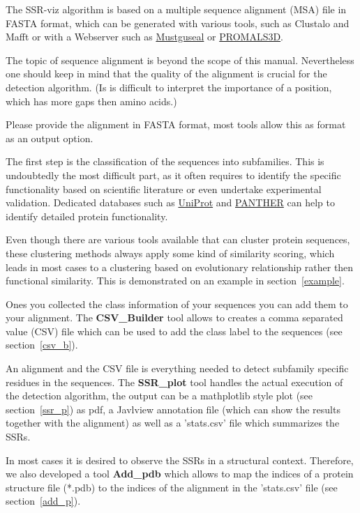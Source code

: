 \documentclass[a4paper,10pt]{article}
\begin{document}
The SSR-viz algorithm is based on a multiple sequence alignment (MSA) file in 
FASTA format, which can be generated with various tools, such as Clustalo 
and Mafft or with a Webserver such as 
\href{https://zeus.cmm.msu.ru/#scenario=2}{Mustguseal} or 
\href{http://prodata.swmed.edu/promals3d/promals3d.php}{PROMALS3D}.

The topic of sequence alignment is beyond the scope of this manual.  
Nevertheless one should keep in mind that 
the quality of the alignment is crucial for the detection algorithm.
(Is is difficult to interpret the importance of a position, which has
more gaps then amino acids.)

Please provide the alignment in FASTA format, most tools allow this as format as
an output option.

The first step is the classification of the sequences into subfamilies.
This is undoubtedly the most difficult part, as it often requires 
to identify the specific functionality based on scientific literature
or even undertake experimental validation. Dedicated databases such as 
\href{https://www.uniprot.org/}{UniProt} and \href{http://www.pantherdb.org/downloads/index.jsp}{PANTHER} 
can help to identify 
detailed protein functionality. 

Even though there are various tools available that can cluster protein sequences, 
these clustering methods always apply some kind of similarity scoring,
which leads in most cases to a clustering based on evolutionary relationship 
rather then functional similarity. 
This is demonstrated on an example in section~\ref{example}.

Ones you collected the class information of your sequences you can add
them to your alignment. The \textbf{CSV\_Builder} tool allows to creates 
a comma separated value (CSV) file which can be used to add the class label to the sequences
(see section~\ref{csv_b}).

An alignment and the CSV file is everything needed to 
detect subfamily specific residues in the sequences. 
The \textbf{SSR\_plot} tool handles the actual execution of the detection
algorithm, the output can be a mathplotlib  style plot (see section~\ref{ssr_p})
as pdf, a Javlview annotation file (which can show the results together with the 
alignment) as well as a 'stats.csv' file which summarizes the SSRs.

In most cases it is desired to observe the SSRs in a structural context.
Therefore, we also developed a tool \textbf{Add\_pdb} which allows
to map the indices of a protein structure file (*.pdb) to the indices of the 
alignment in the 'stats.csv' file (see section~\ref{add_p}).
\end{document}
